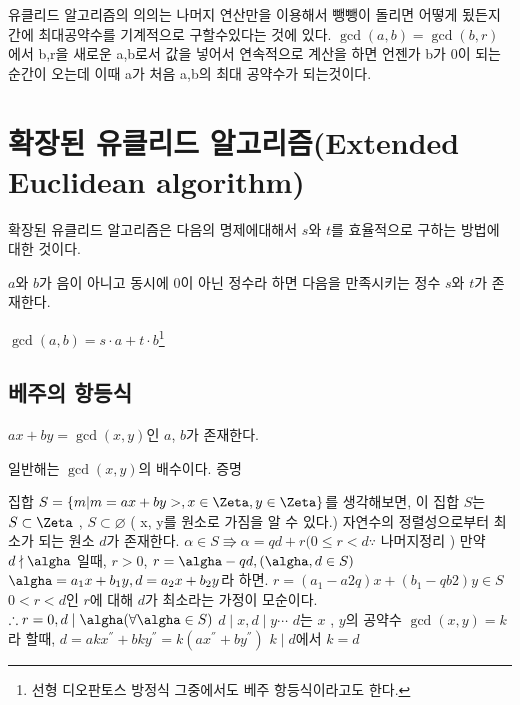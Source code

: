 \documentclass{oblivoir}
\begin{document}
\vspace{1\baselineskip}

유클리드 알고리즘의 의의는 나머지 연산만을 이용해서 뺑뺑이 돌리면 어떻게 됬든지 간에 최대공약수를 기계적으로 구할수있다는 것에 있다. $\gcd(a,b) = \gcd(b,r)$에서 b,r을 새로운 a,b로서 값을 넣어서 연속적으로 계산을 하면 언젠가 b가 0이 되는 순간이 오는데 이때 a가 처음 a,b의 최대 공약수가 되는것이다.
\newpage

\section{확장된 유클리드 알고리즘(Extended Euclidean algorithm)} 
확장된 유클리드 알고리즘은 다음의 명제에대해서 $s$와 $t$를 효율적으로 구하는 방법에대한 것이다. 
\begin{justbox}
$a$와 $b$가 음이 아니고 동시에 0이 아닌 정수라 하면 다음을 만족시키는 정수 $s$와 $t$가 존재한다.
\begin{center}
    $\gcd(a,b) = s\cdot a + t\cdot b$\footnote{선형 디오판토스 방정식 그중에서도 베주 항등식이라고도 한다.}
\end{center}
\end{justbox}

\subsection{베주의 항등식}\par
$ax + by =\gcd(x, y)$인 $a$, $b$가 존재한다.\par
일반해는 $\gcd(x ,y)$의 배수이다.
증명\par 
집합 $S = \left\{ m | m =ax+by> , x\in \Zeta , y \in \Zeta \right\}$를 생각해보면, 이 집합 $S$는 $S \subset \Zeta$ ,  $S \subset \varnothing$ ( x, y를 원소로 가짐을 알 수 있다.) 자연수의 정렬성으로부터 최소가 되는 원소 $d$가 존재한다.
$\alpha \in S \Rrightarrow \alpha = qd+r (0 \le r < d \because$ 나머지정리 )
만약 $d \nmid \algha$ 일때, $r > 0$,
$ r = \algha - qd , (\algha , d \in S)$ 
$\algha = a_{1}x+b_{1}y , d=a_{2}x+b_{2}y$라 하면. $r=(a_{1}-a{2}q)x + (b_{1}-qb{2})y \in S $
$0 < r < d$인 $r$에 대해 $d$가 최소라는 가정이 모순이다. $\therefore r = 0 , d \mid \algha (\forall \algha \in S)$
$ d \mid x, d \mid y \cdots$ $d$는  $x$ , $y$의 공약수
$\gcd(x, y)=k $라 할때, $d = akx^{''}+bky^{''}=k(ax^{''}+by^{''})$
$k \mid d$에서 $ k = d$
\end{document}
